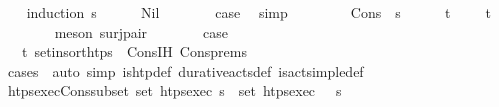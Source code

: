 \begin{isabellebody}
%
\isadelimproof
\ \ %
\endisadelimproof
%
\isatagproof
{}\isamarkupfalse%
\ {\isacharparenleft}{\kern0pt}induction\ {\isasympi}s{\isacharparenright}{\kern0pt}\isanewline
\ \ \ \ \isamarkupfalse%
\ Nil\isanewline
\ \ \ \ \isamarkupfalse%
\ \isamarkupfalse%
\ {\isacharquery}{\kern0pt}case\ \isamarkupfalse%
\ simp\isanewline
\ \ \isamarkupfalse%
\isanewline
\ \ \ \ \isamarkupfalse%
\ {\isacharparenleft}{\kern0pt}Cons\ {\isasympi}\ {\isasympi}s{\isacharparenright}{\kern0pt}\isanewline
\ \ \ \ \isamarkupfalse%
\ t\isactrlsub {\isasympi}\ {\isasympi}{\isacharprime}{\kern0pt}\ \ {\isachardoublequoteopen}{\isasympi}\ {\isacharequal}{\kern0pt}\ {\isacharparenleft}{\kern0pt}t\isactrlsub {\isasympi}{\isacharcomma}{\kern0pt}{\isasympi}{\isacharprime}{\kern0pt}{\isacharparenright}{\kern0pt}{\isachardoublequoteclose}\isanewline
\ \ \ \ \ \ \isamarkupfalse%
\ {\isacharparenleft}{\kern0pt}meson\ surj{\isacharunderscore}{\kern0pt}pair{\isacharparenright}{\kern0pt}\isanewline
\ \ \ \ \isamarkupfalse%
\ \isamarkupfalse%
\ {\isacharquery}{\kern0pt}case\isanewline
\ \ \ \ \ \ \isamarkupfalse%
\ {\isacartoucheopen}{\isasympi}\ {\isacharequal}{\kern0pt}\ {\isacharparenleft}{\kern0pt}t\isactrlsub {\isasympi}{\isacharcomma}{\kern0pt}{\isasympi}{\isacharprime}{\kern0pt}{\isacharparenright}{\kern0pt}{\isacartoucheclose}\ set{\isacharunderscore}{\kern0pt}insort{\isacharunderscore}{\kern0pt}htps\ \ Cons{\isachardot}{\kern0pt}IH\ Cons{\isachardot}{\kern0pt}prems\isanewline
\ \ \ \ \ \ \isamarkupfalse%
\ {\isacharparenleft}{\kern0pt}cases\ {\isasympi}{\isacharprime}{\kern0pt}{\isacharparenright}{\kern0pt}\ {\isacharparenleft}{\kern0pt}auto\ simp{\isacharcolon}{\kern0pt}\ is{\isacharunderscore}{\kern0pt}htp{\isacharunderscore}{\kern0pt}def\ durative{\isacharunderscore}{\kern0pt}acts{\isacharunderscore}{\kern0pt}def\ is{\isacharunderscore}{\kern0pt}act{\isacharunderscore}{\kern0pt}simple{\isacharunderscore}{\kern0pt}def{\isacharparenright}{\kern0pt}\isanewline
\ \ \isamarkupfalse%
%
\endisatagproof
{\isafoldproof}%
%
\isadelimproof
\isanewline
%
\endisadelimproof
\isanewline
\ \ \isamarkupfalse%
\ htps{\isacharunderscore}{\kern0pt}exec{\isacharunderscore}{\kern0pt}Cons{\isacharunderscore}{\kern0pt}subset{\isacharcolon}{\kern0pt}\ {\isachardoublequoteopen}set\ {\isacharparenleft}{\kern0pt}htps{\isacharunderscore}{\kern0pt}exec\ {\isasympi}s{\isacharparenright}{\kern0pt}\ {\isasymsubseteq}\ set\ {\isacharparenleft}{\kern0pt}htps{\isacharunderscore}{\kern0pt}exec\ {\isacharparenleft}{\kern0pt}{\isasympi}\ {\isacharhash}{\kern0pt}\ {\isasympi}s{\isacharparenright}{\kern0pt}{\isacharparenright}{\kern0pt}{\isachardoublequoteclose}\isanewline

\end{isabellebody}
